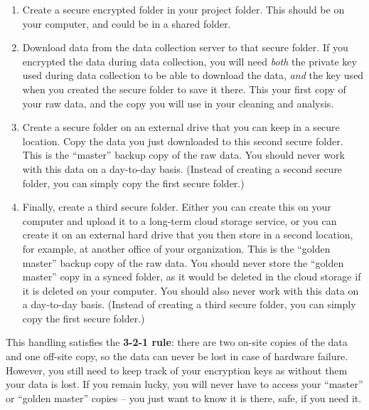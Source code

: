 \begin{enumerate}
	\item Create a secure encrypted folder in your project folder.
  This should be on your computer, and could be in a shared folder.
  
	\item Download data from the data collection server to that secure folder.
	If you encrypted the data during data collection, you will need \textit{both} the
	private key used during data collection to be able to download the data,
	\textit{and} the key used when you created the secure folder to save it there.
	This your first copy of your raw data, and the copy you will use in your cleaning and analysis.
	
	\item Create a secure folder on an external drive that you can keep in a secure location.
	Copy the data you just downloaded to this second secure	folder.
	This is the ``master'' backup copy of the raw data. 
	You should never work with this data on a day-to-day basis.
	(Instead of creating a second secure folder, you can simply copy the first secure folder.)
	
	\item Finally, create a third secure folder.
	Either you can create this on your computer and upload it to a long-term cloud storage service,
	or you can create it on	an external hard drive that you then store in a second location,
	for example, at another office of your organization.
	This is the ``golden master'' backup copy of the raw data.
	You should never store the ``golden master'' copy in a synced folder, 
	as it would be deleted in the cloud storage if it is deleted on your computer.
	You should also never work with this data on a day-to-day basis.
	(Instead of creating a third secure folder, you can simply copy the first secure folder.)
\end{enumerate}

\noindent This handling satisfies the \textbf{3-2-1 rule}:
there are two on-site copies of the data and one off-site copy,
so the data can never be lost in case of hardware failure.
However, you still need to keep track of your encryption keys as without them your data is lost.
If you remain lucky, you will never have to access your ``master'' or ``golden master'' copies --
you just want to know it is there, safe, if you need it.

